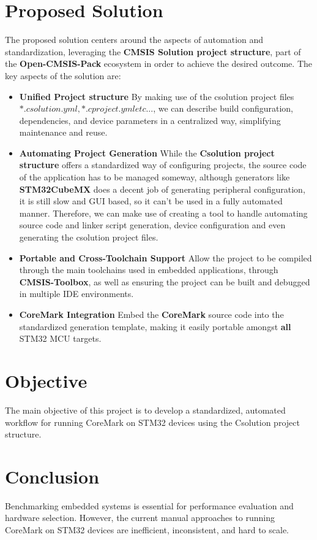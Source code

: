 \section{Proposed Solution}
The proposed solution centers around the aspects of automation and standardization, leveraging the \textbf{CMSIS Solution project structure}, part of the \textbf{Open-CMSIS-Pack} ecosystem in order to achieve the desired outcome.
The key aspects of the solution are:
\begin{itemize}
  \item \textbf{Unified Project structure}
  By making use of the csolution project files \(*.csolution.yml, *.cproject.yml etc...\), we can describe build configuration, dependencies, and device parameters in a centralized way, simplifying maintenance and reuse.
  \item \textbf{Automating Project Generation}
  While the \textbf{Csolution project structure} offers a standardized way of configuring projects, the source code of the application has to be managed someway, although generators like \textbf{STM32CubeMX} does a decent job of generating peripheral configuration, it is still slow and GUI based, so it can't be used in a fully automated manner.
  Therefore, we can make use of creating a tool to handle automating source code and linker script generation, device configuration and even generating the csolution project files.
  \item \textbf{Portable and Cross-Toolchain Support}
  Allow the project to be compiled through the main toolchains used in embedded applications, through \textbf{CMSIS-Toolbox}, as well as ensuring the project can be built and debugged in multiple IDE environments.
  \item \textbf{CoreMark Integration}
  Embed the \textbf{CoreMark} source code into the standardized generation template, making it easily portable amongst \textbf{all} STM32 MCU targets. 
\end{itemize}

\section{Objective}
The main objective of this project is to develop a standardized, automated workflow for running CoreMark on STM32 devices using the Csolution project structure.

\section{Conclusion}
Benchmarking embedded systems is essential for performance evaluation and hardware selection. However, the current manual approaches to running CoreMark on STM32 devices are inefficient, inconsistent, and hard to scale.

